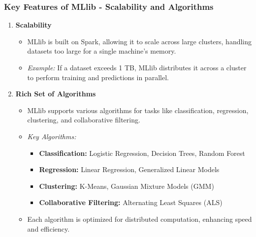 \documentclass[aspectratio=169]{beamer}
\begin{document}
\begin{frame}[fragile]
    \frametitle{Key Features of MLlib - Scalability and Algorithms}
    \begin{enumerate}
        \item \textbf{Scalability}
        \begin{itemize}
            \item MLlib is built on Spark, allowing it to scale across large clusters, handling datasets too large for a single machine's memory.
            \item \textit{Example:} If a dataset exceeds 1 TB, MLlib distributes it across a cluster to perform training and predictions in parallel.
        \end{itemize}

        \item \textbf{Rich Set of Algorithms}
        \begin{itemize}
            \item MLlib supports various algorithms for tasks like classification, regression, clustering, and collaborative filtering.
            \item \textit{Key Algorithms:}
            \begin{itemize}
                \item \textbf{Classification:} Logistic Regression, Decision Trees, Random Forest
                \item \textbf{Regression:} Linear Regression, Generalized Linear Models
                \item \textbf{Clustering:} K-Means, Gaussian Mixture Models (GMM)
                \item \textbf{Collaborative Filtering:} Alternating Least Squares (ALS)
            \end{itemize}
            \item Each algorithm is optimized for distributed computation, enhancing speed and efficiency.
        \end{itemize}
    \end{enumerate}
\end{frame}
\end{document}
